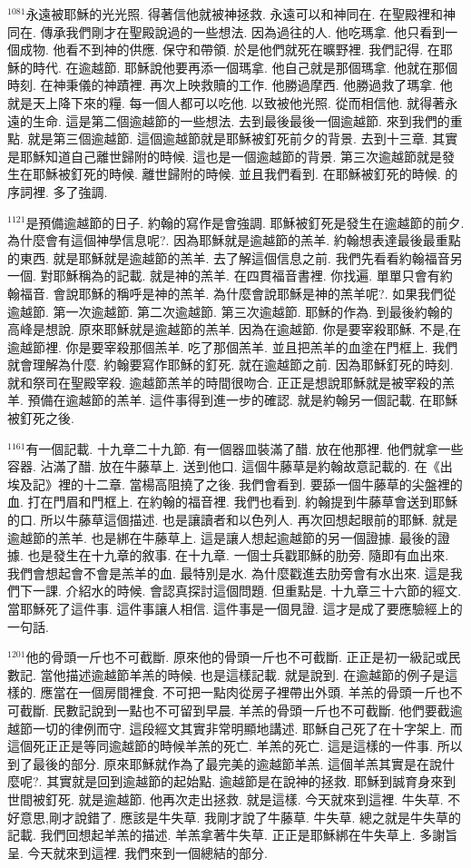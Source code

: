 \documentclass{book}
\begin{document}
$^{1081}$永遠被耶穌的光光照.
得著信他就被神拯救.
永遠可以和神同在.
在聖殿裡和神同在.
傳承我們剛才在聖殿說過的一些想法.
因為過往的人.
他吃瑪拿.
他只看到一個成物.
他看不到神的供應.
保守和帶領.
於是他們就死在曠野裡.
我們記得.
在耶穌的時代.
在逾越節.
耶穌說他要再添一個瑪拿.
他自己就是那個瑪拿.
他就在那個時刻.
在神秉儀的神蹟裡.
再次上映救贖的工作.
他勝過摩西.
他勝過救了瑪拿.
他就是天上降下來的糧.
每一個人都可以吃他.
以致被他光照.
從而相信他.
就得著永遠的生命.
這是第二個逾越節的一些想法.
去到最後最後一個逾越節.
來到我們的重點.
就是第三個逾越節.
這個逾越節就是耶穌被釘死前夕的背景.
去到十三章.
其實是耶穌知道自己離世歸附的時候.
這也是一個逾越節的背景.
第三次逾越節就是發生在耶穌被釘死的時候.
離世歸附的時候.
並且我們看到.
在耶穌被釘死的時候.
的序詞裡.
多了強調.

$^{1121}$是預備逾越節的日子.
約翰的寫作是會強調.
耶穌被釘死是發生在逾越節的前夕.
為什麼會有這個神學信息呢?.
因為耶穌就是逾越節的羔羊.
約翰想表達最後最重點的東西.
就是耶穌就是逾越節的羔羊.
去了解這個信息之前.
我們先看看約翰福音另一個.
對耶穌稱為的記載.
就是神的羔羊.
在四貫福音書裡.
你找遍.
單單只會有約翰福音.
會說耶穌的稱呼是神的羔羊.
為什麼會說耶穌是神的羔羊呢?.
如果我們從逾越節.
第一次逾越節.
第二次逾越節.
第三次逾越節.
耶穌的作為.
到最後約翰的高峰是想說.
原來耶穌就是逾越節的羔羊.
因為在逾越節.
你是要宰殺耶穌.
不是,在逾越節裡.
你是要宰殺那個羔羊.
吃了那個羔羊.
並且把羔羊的血塗在門框上.
我們就會理解為什麼.
約翰要寫作耶穌的釘死.
就在逾越節之前.
因為耶穌釘死的時刻.
就和祭司在聖殿宰殺.
逾越節羔羊的時間很吻合.
正正是想說耶穌就是被宰殺的羔羊.
預備在逾越節的羔羊.
這件事得到進一步的確認.
就是約翰另一個記載.
在耶穌被釘死之後.

$^{1161}$有一個記載.
十九章二十九節.
有一個器皿裝滿了醋.
放在他那裡.
他們就拿一些容器.
沾滿了醋.
放在牛藤草上.
送到他口.
這個牛藤草是約翰故意記載的.
在《出埃及記》裡的十二章.
當楊高阻撓了之後.
我們會看到.
要舔一個牛藤草的尖盤裡的血.
打在門眉和門框上.
在約翰的福音裡.
我們也看到.
約翰提到牛藤草會送到耶穌的口.
所以牛藤草這個描述.
也是讓讀者和以色列人.
再次回想起眼前的耶穌.
就是逾越節的羔羊.
也是綁在牛藤草上.
這是讓人想起逾越節的另一個證據.
最後的證據.
也是發生在十九章的敘事.
在十九章.
一個士兵戳耶穌的肋旁.
隨即有血出來.
我們會想起會不會是羔羊的血.
最特別是水.
為什麼戳進去肋旁會有水出來.
這是我們下一課.
介紹水的時候.
會認真探討這個問題.
但重點是.
十九章三十六節的經文.
當耶穌死了這件事.
這件事讓人相信.
這件事是一個見證.
這才是成了要應驗經上的一句話.

$^{1201}$他的骨頭一斤也不可截斷.
原來他的骨頭一斤也不可截斷.
正正是初一級記或民數記.
當他描述逾越節羊羔的時候.
也是這樣記載.
就是說到.
在逾越節的例子是這樣的.
應當在一個房間裡食.
不可把一點肉從房子裡帶出外頭.
羊羔的骨頭一斤也不可截斷.
民數記說到一點也不可留到早晨.
羊羔的骨頭一斤也不可截斷.
他們要截逾越節一切的律例而守.
這段經文其實非常明顯地講述.
耶穌自己死了在十字架上.
而這個死正正是等同逾越節的時候羊羔的死亡.
羊羔的死亡.
這是這樣的一件事.
所以到了最後的部分.
原來耶穌就作為了最完美的逾越節羊羔.
這個羊羔其實是在說什麼呢?.
其實就是回到逾越節的起始點.
逾越節是在說神的拯救.
耶穌到誠育身來到世間被釘死.
就是逾越節.
他再次走出拯救.
就是這樣.
今天就來到這裡.
牛失草.
不好意思,剛才說錯了.
應該是牛失草.
我剛才說了牛藤草.
牛失草.
總之就是牛失草的記載.
我們回想起羊羔的描述.
羊羔拿著牛失草.
正正是耶穌綁在牛失草上.
多謝旨呈.
今天就來到這裡.
我們來到一個總結的部分.
\end{document}
